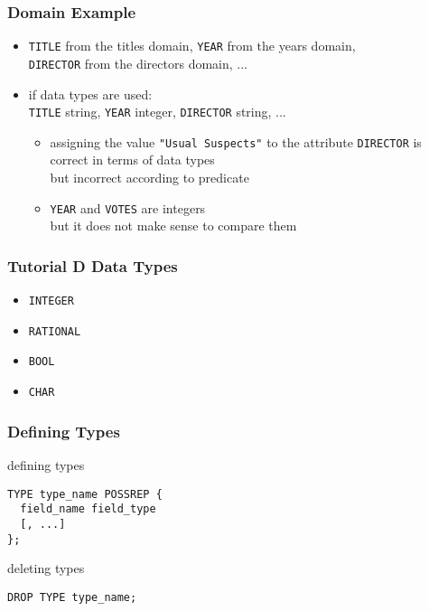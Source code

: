 \documentclass[dvipsnames]{beamer}
\theoremstyle{plain}
\begin{document}
\begin{frame}
  \frametitle{Domain Example}

  \begin{example}
    \begin{itemize}
      \item \texttt{TITLE} from the titles domain, \texttt{YEAR} from the years
        domain,\\
       \texttt{DIRECTOR} from the directors domain, ...

      \pause
      \item if data types are used:\\
        \texttt{TITLE} string, \texttt{YEAR} integer, \texttt{DIRECTOR} string,
          ...

      \begin{itemize}
        \item assigning the value \texttt{"Usual Suspects"} to the attribute
          \texttt{DIRECTOR} is correct in terms of data types\\
          but incorrect according to predicate

        \item \texttt{YEAR} and \texttt{VOTES} are integers\\
          but it does not make sense to compare them
      \end{itemize}
    \end{itemize}
  \end{example}
\end{frame}

\begin{frame}
  \frametitle{Tutorial D Data Types}

  \begin{itemize}
    \item \texttt{INTEGER}
    \item \texttt{RATIONAL}
    \item \texttt{BOOL}
    \item \texttt{CHAR}
  \end{itemize}
\end{frame}

\begin{frame}[fragile]
  \frametitle{Defining Types}

  \begin{block}{defining types}
    \begin{lstlisting}
TYPE type_name POSSREP {
  field_name field_type
  [, ...]
};
    \end{lstlisting}
  \end{block}

  \pause
  \begin{block}{deleting types}
    \begin{lstlisting}
DROP TYPE type_name;
    \end{lstlisting}
  \end{block}
\end{frame}
\end{document}
